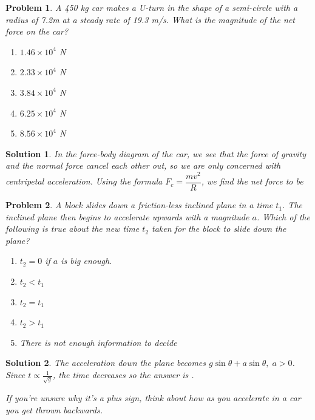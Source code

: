 \documentclass[12pt]{article}
\newcommand{\clearpts}{\addtocounter{tpts}{\value{cpts}} \setcounter{cpts}{0}}
\newcommand{\pts}[1]{\clearpts \setcounter{cpts}{#1}}
\newtheorem*{solution}{Solution}
\theoremstyle{mystyle}
\newtheorem{pproblem}{Problem}
\begin{document}
\pts{2}
\begin{pproblem}
    A 450 kg car makes a U-turn in the shape of a semi-circle with a radius of 7.2m at a steady rate of 19.3 m/s. What is the magnitude of the net force on the car? 
    \begin{enumerate}[label=(\Alph*)]
        \item $1.46 \times 10^4$ N
        \item $2.33 \times 10^4$ N
        \item $3.84 \times 10^4$ N
        \item $6.25 \times 10^4$ N
        \item $8.56 \times 10^4$ N
    \end{enumerate}
\end{pproblem}
\begin{solution}
    In the force-body diagram of the car, we see that the force of gravity and the normal force cancel each other out, so we are only concerned with centripetal acceleration. Using the formula $F_{c} = \dfrac{mv^2}{R}$, we find the net force to be  
\end{solution}

\pts{2}
\begin{pproblem}
    A block slides down a friction-less inclined plane in a time $t_1$.
    The inclined plane then begins to accelerate upwards with a magnitude $a$.
    Which of the following is true about the new time $t_2$ taken for the block
    to slide down the plane?
    \begin{enumerate}[label=(\Alph*)]
        \item $t_2=0$ if $a$ is big enough.
        \item $t_2 < t_1$
        \item $t_2 = t_1$
        \item $t_2 > t_1$
        \item There is not enough information to decide
    \end{enumerate}
\end{pproblem}

\begin{solution}
    The acceleration down the plane becomes $g\sin\theta+a\sin\theta,\;a>0$. Since $t\propto \frac1{\sqrt{g}}$,
    the time decreases so the answer is .
    
    If you're unsure why it's a plus sign, think about how as you accelerate in a car you
    get thrown backwards.
\end{solution}
\end{document}
